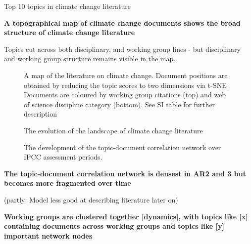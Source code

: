 \documentclass{article}
\begin{document}
\begin{linenumbers}
\begin{table}
	\scriptsize
	
	\caption{Top 10 topics in climate change literature}
\end{table}

\bigskip
\noindent\textbf{A topographical map of climate change documents shows the broad structure of climate change literature}

Topics cut across both disciplinary, and working group lines - but disciplinary and working group structure remains visible in the map.

\begin{figure}
	\begin{center}
		\caption{A map of the literature on climate change. Document positions are obtained by reducing the topic scores to two dimensions via t-SNE Documents are coloured by working group citations (top) and web of science discipline category (bottom). See SI table for further description}
		\label{}
	\end{center}
\end{figure}

\begin{figure}
	\begin{center}
		\caption{The evolution of the landscape of climate change literature}
		\label{}
	\end{center}
\end{figure}


\begin{figure}
	\begin{center}
		\caption{The development of the topic-document correlation network over IPCC assessment periods.}
		\label{}
	\end{center}
\end{figure}

\bigskip
\noindent\textbf{The topic-document correlation network is densest in AR2 and 3 but becomes more fragmented over time}

(partly: Model less good at describing literature later on)

\bigskip
\noindent\textbf{Working groups are clustered together [dynamics], with topics like [x] containing documents across working groups and topics like [y] important network nodes}



\end{linenumbers}
\end{document}
